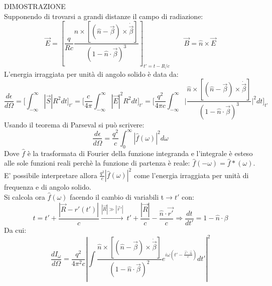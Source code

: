 \documentclass[twoside]{article}
\begin{document}
DIMOSTRAZIONE\\
Supponendo di trovarsi a grandi distanze il campo di radiazione:
\begin{equation}
    \vec{E}=\left[\frac{q}{R c}\frac{\hat{n}\times[(\hat{n}-\vec{\beta})\times \dot{\vec{\beta}}]}{(1-\hat{n}\cdot \vec{\beta})^3}\right]_{t'=t-R/c} \qquad \vec{B}=\hat{n}\times \vec{E}
\end{equation}
L'energia irraggiata per unità di angolo solido è data da:
\begin{equation}
    \frac{d\epsilon}{d\Omega}=\biggl[\int_{-\infty}^\infty|\vec{S}|R^2dt\biggr]_{t'}=\biggl[\frac{c}{4\pi}\int_{-\infty}^\infty |\vec{E}|^2R^2dt\biggr]_{t'}=\biggl[\frac{q^2}{4\pi c}\int_{-\infty}^\infty \biggl|\frac{\hat{n}\times[(\hat{n}-\vec{\beta})\times \dot{\vec{\beta}}]}{(1-\hat{n}\cdot \vec{\beta})^3}\biggr|^2dt\biggr]_{t'}
\end{equation}
Usando il teorema di Parseval si può scrivere:
\begin{equation}
    \frac{d\epsilon}{d\Omega}=\frac{q^2}{c}\int_0^\infty |\hat{f}(\omega)|^2d\omega
\end{equation}
Dove $\hat{f}$ è la trasformata di Fourier della funzione integranda e l'integrale è esteso alle sole funzioni reali perchè la funzione di partenza è reale: $\hat{f}(-\omega)=\hat{f}*(\omega)$.\\
E' possibile interpretare allora $\frac{q^2}{c}|\hat{f}(\omega)|^2$ come l'energia irraggiata per unità di frequenza e di angolo solido.\\
Si calcola ora $\hat{f}(\omega)$ facendo il cambio di variabili t$\to t'$ con:
\begin{equation}
    t=t'+\frac{|\vec{R}-r'(t')|}{c}\xrightarrow{|\vec{R}|\gg|\vec{r}'|}\ t'+\frac{|\vec{R}|}{c}-\frac{\hat{n}\cdot\vec{r'}}{c} \Longrightarrow \frac{dt}{dt'}=1-\hat{n}\cdot\beta
\end{equation}
Da cui:
\begin{equation}
   \frac{dI_\omega}{d\Omega}=\frac{q^2}{4\pi^2c}\left|\int \frac{\hat{n}\times[(\hat{n}-\vec{\beta})\times \dot{\vec{\beta}}]}{(1-\hat{n}\cdot \vec{\beta})^2} e^{i\omega(t'-\frac{\vec{r}'\cdot\hat{n}}{c})} dt'\right|^2
\end{equation}
\end{document}
